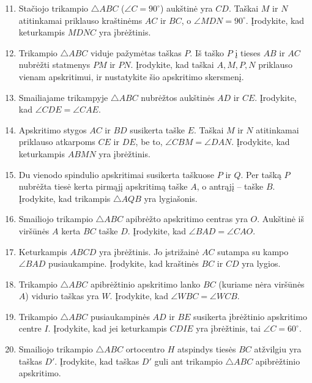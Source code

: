 \documentclass[11pt,a4paper]{scrartcl}
\begin{document}
\begin{enumerate}
    \setcounter{enumi}{10}
    \item Stačiojo trikampio $\triangle ABC$ ($\angle C=90^\circ$) aukštinė yra $CD$. Taškai $M$ ir $N$ atitinkamai priklauso kraštinėms $AC$ ir $BC$, o $\angle MDN = 90^\circ$. Įrodykite, kad keturkampis $MDNC$ yra įbrėžtinis.
    \item Trikampio $\triangle ABC$ viduje pažymėtas taškas $P$. Iš taško $P$ į tieses $AB$ ir $AC$ nubrėžti statmenys $PM$ ir $PN$. Įrodykite, kad taškai $A, M, P, N$ priklauso vienam apskritimui, ir nustatykite šio apskritimo skersmenį.
    \item Smailiajame trikampyje $\triangle ABC$ nubrėžtos aukštinės $AD$ ir $CE$. Įrodykite, kad $\angle CDE = \angle CAE$.
    \item Apskritimo stygos $AC$ ir $BD$ susikerta taške $E$. Taškai $M$ ir $N$ atitinkamai priklauso atkarpoms $CE$ ir $DE$, be to, $\angle CBM = \angle DAN$. Įrodykite, kad keturkampis $ABMN$ yra įbrėžtinis.
    \item Du vienodo spindulio apskritimai susikerta taškuose $P$ ir $Q$. Per tašką $P$ nubrėžta tiesė kerta pirmąjį apskritimą taške $A$, o antrąjį – taške $B$. Įrodykite, kad trikampis $\triangle AQB$ yra lygiašonis.
    \item Smailiojo trikampio $\triangle ABC$ apibrėžto apskritimo centras yra $O$. Aukštinė iš viršūnės $A$ kerta $BC$ taške $D$. Įrodykite, kad $\angle BAD = \angle CAO$.
    \item Keturkampis $ABCD$ yra įbrėžtinis. Jo įstrižainė $AC$ sutampa su kampo $\angle BAD$ pusiaukampine. Įrodykite, kad kraštinės $BC$ ir $CD$ yra lygios.
    \item Trikampio $\triangle ABC$ apibrėžtinio apskritimo lanko $BC$ (kuriame nėra viršūnės $A$) vidurio taškas yra $W$. Įrodykite, kad $\angle WBC = \angle WCB$.
    \item Trikampio $\triangle ABC$ pusiaukampinės $AD$ ir $BE$ susikerta įbrėžtinio apskritimo centre $I$. Įrodykite, kad jei keturkampis $CDIE$ yra įbrėžtinis, tai $\angle C = 60^\circ$.
    \item Smailiojo trikampio $\triangle ABC$ ortocentro $H$ atspindys tiesės $BC$ atžvilgiu yra taškas $D'$. Įrodykite, kad taškas $D'$ guli ant trikampio $\triangle ABC$ apibrėžtinio apskritimo.
\end{enumerate}
\end{document}
